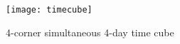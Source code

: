 \documentclass{article}
\begin{document}
\begin{figure}[h] %
  \caption{4-corner simultaneous 4-day time cube}
  \centering %

  \texttt{[image: timecube]}
\end{figure}
\end{document}
